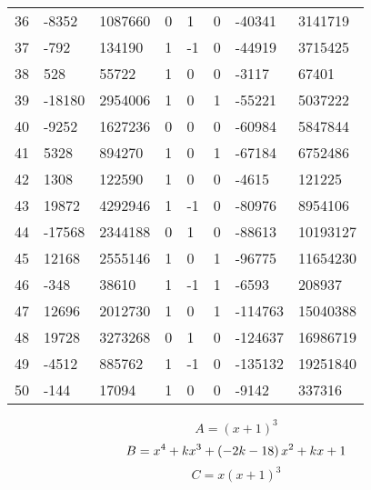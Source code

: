 \documentclass{amsart}
\begin{document}
\begin{longtable}{|l|l|l|lllll|}
36&-8352&1087660&0&1&0&-40341&3141719\\
37&-792&134190&1&-1&0&-44919&3715425\\
38&528&55722&1&0&0&-3117&67401\\
39&-18180&2954006&1&0&1&-55221&5037222\\
40&-9252&1627236&0&0&0&-60984&5847844\\
41&5328&894270&1&0&1&-67184&6752486\\
42&1308&122590&1&0&0&-4615&121225\\
43&19872&4292946&1&-1&0&-80976&8954106\\
44&-17568&2344188&0&1&0&-88613&10193127\\
45&12168&2555146&1&0&1&-96775&11654230\\
46&-348&38610&1&-1&1&-6593&208937\\
47&12696&2012730&1&0&1&-114763&15040388\\
48&19728&3273268&0&1&0&-124637&16986719\\
49&-4512&885762&1&-1&0&-135132&19251840\\
50&-144&17094&1&0&0&-9142&337316\\
\hline
\end{longtable}
$$A=(x
 + 1)^{3}$$
$$B=x^4
 + k\*x^3
 + \left(-2\*k
 - 18\right) \*x^2
 + k\*x
 + 1$$
$$C=x(x
 + 1)^{3}$$
\end{document}

